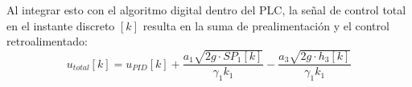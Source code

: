 Al integrar esto con el algoritmo digital dentro del PLC, la señal de control total en el instante discreto $[k]$ resulta en la suma de prealimentación y el control retroalimentado:
\begin{equation}
    u_{total}[k] = u_{PID}[k] + \frac{a_1 \sqrt{2g \cdot SP_1[k]}}{\gamma_1 k_1} - \frac{a_3 \sqrt{2g \cdot h_3[k]}}{\gamma_1 k_1}
\end{equation}
